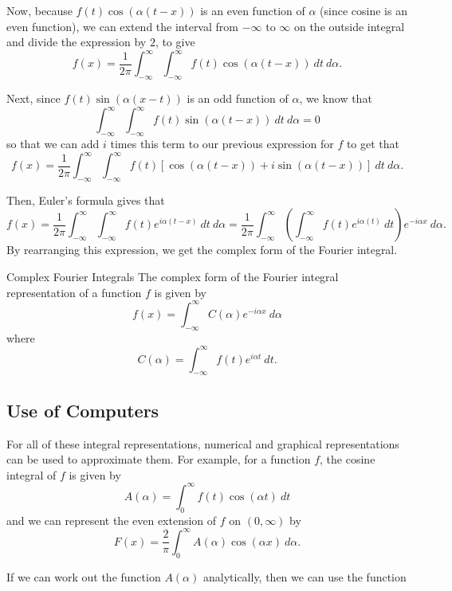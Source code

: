 Now, because $f(t)\cos(\alpha(t-x))$ is an even function of $\alpha$ (since cosine is an even function), we can extend the interval from $-\infty$ to $\infty$ on the outside integral and divide the expression by $2$, to give
\[ f(x) = \frac{1}{2\pi} \int_{-\infty}^\infty \int_{-\infty}^\infty f(t) \cos(\alpha(t-x))\ dt\ d\alpha. \]

Next, since $f(t) \sin(\alpha(x-t))$ is an odd function of $\alpha$, we know that 
\[  \int_{-\infty}^\infty \int_{-\infty}^\infty f(t) \sin(\alpha(t-x))\ dt\ d\alpha = 0 \] so that we can add $i$ times this term to our previous expression for $f$ to get that
\[ f(x) = \frac{1}{2\pi} \int_{-\infty}^\infty \int_{-\infty}^\infty f(t) \left[\cos(\alpha(t-x)) + i \sin(\alpha(t-x))\right] \ dt\ d\alpha. \]

Then, Euler's formula gives that
\[ f(x) = \frac{1}{2\pi} \int_{-\infty}^\infty \int_{-\infty}^\infty f(t)e^{i\alpha(t-x)}\ dt\ d\alpha = \frac{1}{2\pi} \int_{-\infty}^\infty \left(\int_{-\infty}^\infty f(t)e^{i\alpha(t)}\ dt \right) e^{-i\alpha x}\ d\alpha. \]
By rearranging this expression, we get the complex form of the Fourier integral.

\begin{theorem1}{Complex Fourier Integrals}
The complex form of the Fourier integral representation of a function $f$ is given by
\[ f(x) = \int_{-\infty}^\infty C(\alpha) e^{-i\alpha x}\ d\alpha \] where
\[C(\alpha) = \int_{-\infty}^\infty f(t)e^{i\alpha t}\ dt.\]
\end{theorem1}

\subsection{Use of Computers}

For all of these integral representations, numerical and graphical representations can be used to approximate them. For example, for a function $f$, the cosine integral of $f$ is given by 
\[ A(\alpha) = \int_0^\infty f(t) \cos(\alpha t)\ dt \] and we can represent the even extension of $f$ on $(0, \infty)$ by
\[ F(x) = \frac{2}{\pi} \int_{0}^\infty A(\alpha) \cos(\alpha x)\ d\alpha. \]

If we can work out the function $A(\alpha)$ analytically, then we can use the function

